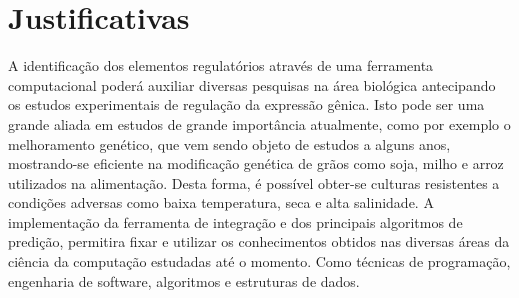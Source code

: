 \chapter{Justificativas}
 A identificação dos elementos regulatórios através de uma ferramenta computacional poderá auxiliar diversas pesquisas na área biológica antecipando os estudos experimentais de regulação da expressão gênica. Isto pode ser uma grande aliada em estudos de grande importância atualmente, como por exemplo o melhoramento genético, que vem sendo objeto de estudos a alguns anos, mostrando-se eficiente na modificação genética de grãos como soja, milho e arroz utilizados na alimentação. Desta forma, é possível obter-se culturas resistentes a condições adversas como baixa temperatura, seca e alta salinidade.
 A implementação da ferramenta de integração e dos principais algoritmos de predição, permitira fixar e utilizar os conhecimentos obtidos nas diversas áreas da ciência da computação estudadas até o momento. Como técnicas de programação, engenharia de software, algoritmos e estruturas de dados.